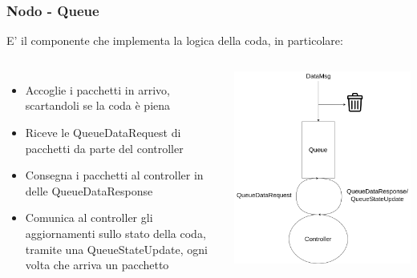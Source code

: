 \documentclass[compress]{beamer}
\begin{document}
\subsubsection*{Nodo - Queue}
\begin{frame}{\subsubsecname}
    E' il componente che implementa la logica della coda, in particolare:
    \vspace{0.5cm}
        \begin{columns}
                \begin{minipage}[b]{1\textwidth}
                    \begin{itemize}
                        \item Accoglie i pacchetti in arrivo, scartandoli se la coda è piena
                        \item Riceve le QueueDataRequest di pacchetti da parte del controller
                        \item Consegna i pacchetti al controller in delle QueueDataResponse
                        \item Comunica al controller gli aggiornamenti sullo stato della coda, tramite una QueueStateUpdate, ogni volta che arriva un pacchetto
                    \end{itemize}
                \end{minipage}
                \begin{minipage}{.9\textwidth}
                    \begin{adjustbox}{margin=0.5cm 0cm 0.1cm 0cm, center} %
                        \includegraphics[width=1\textwidth]{figs/queue_scheme.png}
                    \end{adjustbox}
                \end{minipage}
        \end{columns}
\end{frame}
\end{document}
